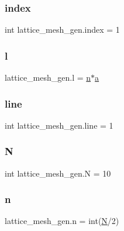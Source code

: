 \subsubsection{\texorpdfstring{index}{index}}
{\footnotesize\ttfamily int lattice\+\_\+mesh\+\_\+gen.\+index = 1}

\mbox{\label{namespacelattice__mesh__gen_a58cedc5fe78cbd7d5824c3ad2e0d6ace}} 
\subsubsection{\texorpdfstring{l}{l}}
{\footnotesize\ttfamily lattice\+\_\+mesh\+\_\+gen.\+l = \mbox{\hyperlink{namespacelattice__mesh__gen_ae3c1557409cb7f6416beac54d47c76b2}{n}}$\ast$\mbox{\hyperlink{namespacelattice__mesh__gen_a9b408c7e0116513bd91341c7c1825e62}{a}}}

\mbox{\label{namespacelattice__mesh__gen_a99f0e79523670fd8c474a01f108a2fce}} 
\subsubsection{\texorpdfstring{line}{line}}
{\footnotesize\ttfamily int lattice\+\_\+mesh\+\_\+gen.\+line = 1}

\mbox{\label{namespacelattice__mesh__gen_a06e6d250f7d6f463d8e22a6d6314d349}} 
\subsubsection{\texorpdfstring{N}{N}}
{\footnotesize\ttfamily int lattice\+\_\+mesh\+\_\+gen.\+N = 10}

\mbox{\label{namespacelattice__mesh__gen_ae3c1557409cb7f6416beac54d47c76b2}} 
\subsubsection{\texorpdfstring{n}{n}}
{\footnotesize\ttfamily lattice\+\_\+mesh\+\_\+gen.\+n = int(\mbox{\hyperlink{namespacelattice__mesh__gen_a06e6d250f7d6f463d8e22a6d6314d349}{N}}/2)}

